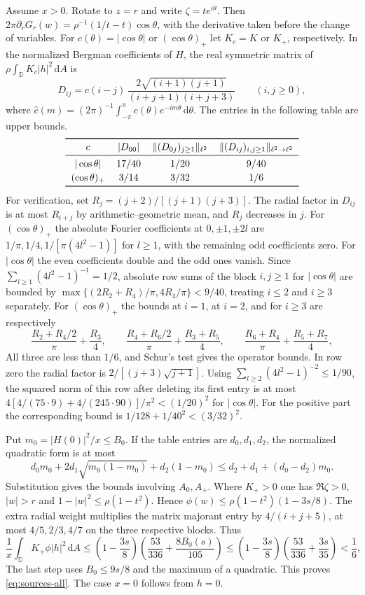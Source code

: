 \documentclass[11pt,a4paper,reqno]{amsart}
\theoremstyle{remark}
\numberwithin{equation}{section}
\newcommand{\dd}{\,\mathrm d}
\newcommand{\D}{\mathbb D}
\begin{document}
Assume $x>0$. Rotate to $z=r$ and write $\zeta=t e^{i\theta}$.
Then $2\pi\partial_rG_r(w)=\rho^{-1}(1/t-t)\cos\theta$, with the derivative
taken before the change of variables. For $c(\theta)=|\cos\theta|$ or
$(\cos\theta)_+$ let $K_c=K$ or $K_+$, respectively. In the normalized
Bergman coefficients of $H$, the real symmetric matrix of
$\rho\int_\D K_c|h|^2\dd A$ is
\[
  D_{ij}=\widehat c(i-j)\,\frac{2\sqrt{(i+1)(j+1)}}{(i+j+1)(i+j+3)}
  \qquad(i,j\ge0),
\]
where $\widehat c(m)=(2\pi)^{-1}\int_{-\pi}^{\pi}c(\theta)e^{-im\theta}\dd\theta$.
The entries in the following table are upper bounds.
\[
  \begin{tabular}{cccc}
    \toprule
    $c$ & $|D_{00}|$ & $\|(D_{0j})_{j\ge1}\|_{\ell^2}$ & $\|(D_{ij})_{i,j\ge1}\|_{\ell^2\to\ell^2}$ \\
    \midrule
    $|\cos\theta|$ & $17/40$ & $1/20$ & $9/40$ \\[2pt]
    $(\cos\theta)_+$ & $3/14$ & $3/32$ & $1/6$ \\
    \bottomrule
  \end{tabular}
\]
For verification, set $R_j=(j+2)/[(j+1)(j+3)]$. The radial factor
in $D_{ij}$ is at most $R_{i+j}$ by arithmetic--geometric mean, and
$R_j$ decreases in $j$. For $(\cos\theta)_+$ the absolute Fourier
coefficients at $0,\pm1,\pm2l$ are $1/\pi,1/4,1/[\pi(4l^2-1)]$ for
$l\ge1$, with the remaining odd coefficients zero. For $|\cos\theta|$
the even coefficients double and the odd ones vanish. Since
$\sum_{l\ge1}(4l^2-1)^{-1}=1/2$, absolute row sums of the block
$i,j\ge1$ for $|\cos\theta|$ are bounded by
$\max\{(2R_2+R_4)/\pi,4R_4/\pi\}<9/40$, treating $i\le2$ and $i\ge3$
separately. For $(\cos\theta)_+$ the bounds at $i=1$, at $i=2$, and for
$i\ge3$ are respectively
\[
  \frac{R_2+R_4/2}{\pi}+\frac{R_3}{4},\qquad
  \frac{R_4+R_6/2}{\pi}+\frac{R_3+R_5}{4},\qquad
  \frac{R_6+R_4}{\pi}+\frac{R_5+R_7}{4},
\]
All three are less than $1/6$, and Schur's test gives the operator
bounds. In row zero the radial factor is $2/[(j+3)\sqrt{j+1}]$.
Using $\sum_{l\ge2}(4l^2-1)^{-2}\le1/90$, the squared norm of this row
after deleting its first entry is at most
$4[4/(75\cdot9)+4/(245\cdot90)]/\pi^2<(1/20)^2$ for $|\cos\theta|$.
For the positive part the corresponding bound is $1/128+1/40^2<(3/32)^2$.

Put $m_0=|H(0)|^2/x\le B_0$. If the table entries are $d_0,d_1,d_2$,
the normalized quadratic form is at most
\[
 d_0m_0+2d_1\sqrt{m_0(1-m_0)}+d_2(1-m_0)\le d_2+d_1+(d_0-d_2)m_0 .
\]
Substitution gives the bounds involving $A_0,A_+$. Where $K_+>0$ one has
$\Re\zeta>0$, $|w|>r$ and $1-|w|^2\le\rho(1-t^2)$. Hence
$\phi(w)\le\rho(1-t^2)(1-3s/8)$. The extra radial weight multiplies the
matrix majorant entry by $4/(i+j+5)$, at most $4/5,2/3,4/7$ on the
three respective blocks. Thus
\[
  \frac{1}{x}\int_\D K_+\phi|h|^2\dd A
    \le\left(1-\frac{3s}{8}\right)\left(\frac{53}{336}+\frac{8B_0(s)}{105}\right)
    \le\left(1-\frac{3s}{8}\right)\left(\frac{53}{336}+\frac{3s}{35}\right)<\frac16,
\]
The last step uses $B_0\le9s/8$ and the maximum of a quadratic. This
proves \eqref{eq:sources-all}. The case $x=0$ follows from $h=0$.
\end{document}
